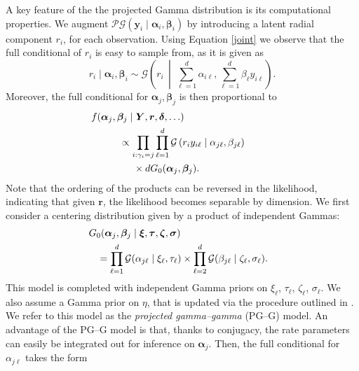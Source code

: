 \documentclass[iicol,sn-basic]{sn-jnl}
\newcommand{\bigmid}{\,\middle\vert\,}
\theoremstyle{thmstyleone}
\begin{document}
A key feature of the the projected Gamma distribution is its computational properties. We augment $\mathcal{PG}(\bm{y}_i\mid\bm{\alpha}_i,\bm{\beta}_i) $ by introducing a latent radial component $r_i$, for each observation. Using Equation \eqref{joint} we observe that the full conditional of $r_i$ is easy to sample from, as it is given as
\begin{equation}
r_i\mid\bm{\alpha}_i,\bm{\beta}_i \sim \mathcal{G}\left(r_i \bigmid \sum_{\ell = 1}^d\alpha_{i\ell}, \sum_{\ell = 1}^d\beta_{\ell} y_{i\ell}\right).
\end{equation}
Moreover,  the full conditional for $\bm{\alpha}_j,\bm{\beta}_j$ is then proportional to
\begin{equation}
\begin{aligned}
&\hspace{-1cm}f(\bm{\alpha}_j,\bm{\beta}_j\mid \bm{Y},\bm{r},\bm{\delta},\ldots) \\
&\propto \prod_{i:\gamma_i = j}\prod_{\ell = 1}^d\mathcal{G}\left(r_iy_{i\ell}\mid\alpha_{j\ell},\beta_{j\ell}\right) \\
&\hspace{0.5cm} \times dG_0(\bm{\alpha}_j,\bm{\beta}_j).
\end{aligned}
\end{equation}
Note that the ordering of the products can be reversed in the likelihood, indicating that given $\bm{r}$, the likelihood becomes separable by dimension.  We first consider a centering distribution given by a product of independent Gammas:
\begin{equation}
\begin{aligned}
&\hspace{-0.3cm}G_0(\bm{\alpha}_j,\bm{\beta}_j\mid \bm{\xi},\bm{\tau},\bm{\zeta},\bm{\sigma}) \\
&= \prod_{\ell = 1}^d\mathcal{G}(\alpha_{j\ell}\mid \xi_{\ell},\tau_{\ell})\times\prod_{\ell = 2}^d\mathcal{G}(\beta_{j\ell}\mid\zeta_{\ell},\sigma_{\ell}).
\end{aligned}
\end{equation}
This model is completed with independent Gamma priors on $\xi_{\ell}$, $\tau_{\ell}$, $\zeta_{\ell}$, $\sigma_{\ell}$.  We also assume a Gamma prior on $\eta$, that is updated via the procedure outlined in \cite{escobar1995}.  We refer to this model as the \emph{projected gamma--gamma} (PG--G) model.  An advantage of the PG--G model is that, thanks to conjugacy, the rate parameters can easily be integrated out for inference on $\bm{\alpha}_j$.  Then, the full conditional for $\alpha_{j\ell}$ takes the form
\end{document}
